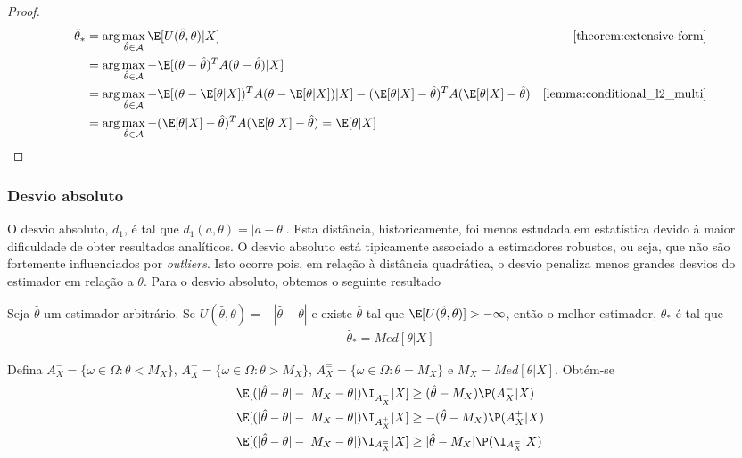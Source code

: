 \begin{proof}
 \begin{align*}
  \hat{\theta}_{*}
  &= \arg\max_{\hat{\theta} \in \mathcal{A}}
  \E[U(\hat{\theta},\theta)|X]
  & \text{\cref{theorem:extensive-form}} \\
  &= \arg\max_{\hat{\theta} \in \mathcal{A}}
  -\E[(\theta-\hat{\theta})^{T}A(\theta-\hat{\theta})|X] \\
  &= \arg\max_{\hat{\theta} \in \mathcal{A}}
  -\E[(\theta-\E[\theta|X])^{T}A(\theta-\E[\theta|X])|X]
  -(\E[\theta|X]-\hat{\theta})^{T}A(\E[\theta|X]-\hat{\theta})	
  & \text{\cref{lemma:conditional_l2_multi}} \\
  &= \arg\max_{\hat{\theta} \in \mathcal{A}}
  -(\E[\theta|X]-\hat{\theta})^{T}A(\E[\theta|X]-\hat{\theta}) 
  = \E[\theta|X]
 \end{align*}
\end{proof}

\subsubsection{Desvio absoluto}

O desvio absoluto, $d_{1}$, é tal que 
$d_{1}(a,\theta) = |a-\theta|$.
Esta distância, historicamente, foi 
menos estudada em estatística devido
à maior dificuldade de obter resultados analíticos.
O desvio absoluto está tipicamente associado a 
estimadores robustos, ou seja, 
que não são fortemente influenciados por \emph{outliers}.
Isto ocorre pois, em relação à distância quadrática,
o desvio penaliza menos grandes desvios do estimador 
em relação a $\theta$.
Para o desvio absoluto, obtemos o seguinte resultado

\begin{theorem}
 \label{thm:estimation_l1}
 Seja $\hat{\theta}$ um estimador arbitrário.
 Se $U(\hat{\theta},\theta) = -|\hat{\theta}-\theta|$ e
 existe $\hat{\theta}$ tal que 
 $\E[U(\hat{\theta},\theta)] > -\infty$, então 
 o melhor estimador, $\hat{\theta}_{*}$ é tal que
 \begin{align*}
  \hat{\theta}_{*} = Med[\theta|X]
 \end{align*}
\end{theorem}

\begin{lemma}
 \label{lemma:estimation_l1}
 Defina $A^{-}_X = \{\omega \in \Omega: \theta < M_{X}\}$, 
 $A^{+}_X = \{\omega \in \Omega: \theta > M_{X}\}$, 
 $A^{=}_{X} = \{\omega \in \Omega: \theta = M_{X}\}$ e
 $M_X=Med[\theta|X]$. Obtém-se
 \begin{align*}
  \E[(|\hat{\theta}-\theta|-|M_{X}-\theta|)\I_{A^{-}_X}|X]
  &\geq (\hat{\theta}-M_{X})\P(A^{-}_X|X) \\
  \E[(|\hat{\theta}-\theta|-|M_{X}-\theta|)\I_{A^{+}_X}|X]
  &\geq -(\hat{\theta}-M_{X})\P(A^{+}_X|X) \\
  \E[(|\hat{\theta}-\theta|-|M_{X}-\theta|)\I_{A^{=}_X}|X]
  &\geq |\hat{\theta}-M_{X}|\P(\I_{A^{=}_X}|X)
 \end{align*}
\end{lemma}

